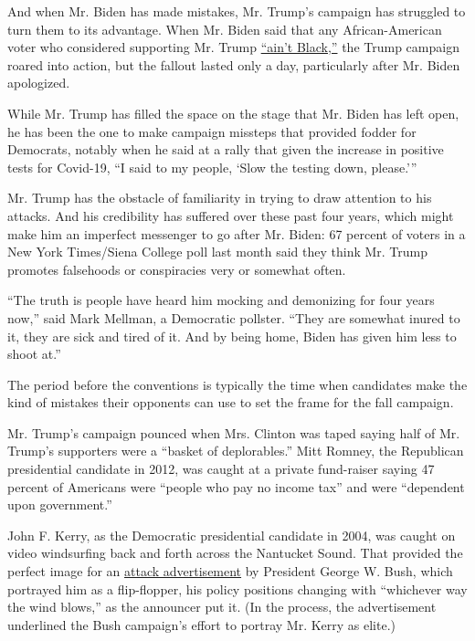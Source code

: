 And when Mr. Biden has made mistakes, Mr. Trump's campaign has struggled
to turn them to its advantage. When Mr. Biden said that any
African-American voter who considered supporting Mr. Trump
\href{https://www.nytimes3xbfgragh.onion/2020/05/22/us/politics/joe-biden-black-breakfast-club.html}{``ain't
Black,''} the Trump campaign roared into action, but the fallout lasted
only a day, particularly after Mr. Biden apologized.

While Mr. Trump has filled the space on the stage that Mr. Biden has
left open, he has been the one to make campaign missteps that provided
fodder for Democrats, notably when he said at a rally that given the
increase in positive tests for Covid-19, ``I said to my people, `Slow
the testing down, please.'''

Mr. Trump has the obstacle of familiarity in trying to draw attention to
his attacks. And his credibility has suffered over these past four
years, which might make him an imperfect messenger to go after Mr.
Biden: 67 percent of voters in a New York Times/Siena College poll last
month said they think Mr. Trump promotes falsehoods or conspiracies very
or somewhat often.

``The truth is people have heard him mocking and demonizing for four
years now,'' said Mark Mellman, a Democratic pollster. ``They are
somewhat inured to it, they are sick and tired of it. And by being home,
Biden has given him less to shoot at.''

The period before the conventions is typically the time when candidates
make the kind of mistakes their opponents can use to set the frame for
the fall campaign.

Mr. Trump's campaign pounced when Mrs. Clinton was taped saying half of
Mr. Trump's supporters were a ``basket of deplorables.'' Mitt Romney,
the Republican presidential candidate in 2012, was caught at a private
fund-raiser saying 47 percent of Americans were ``people who pay no
income tax'' and were ``dependent upon government.''

John F. Kerry, as the Democratic presidential candidate in 2004, was
caught on video windsurfing back and forth across the Nantucket Sound.
That provided the perfect image for an
\href{https://www.youtube.com/watch?v=2QpS2Am51Wo}{attack advertisement}
by President George W. Bush, which portrayed him as a flip-flopper, his
policy positions changing with ``whichever way the wind blows,'' as the
announcer put it. (In the process, the advertisement underlined the Bush
campaign's effort to portray Mr. Kerry as elite.)


